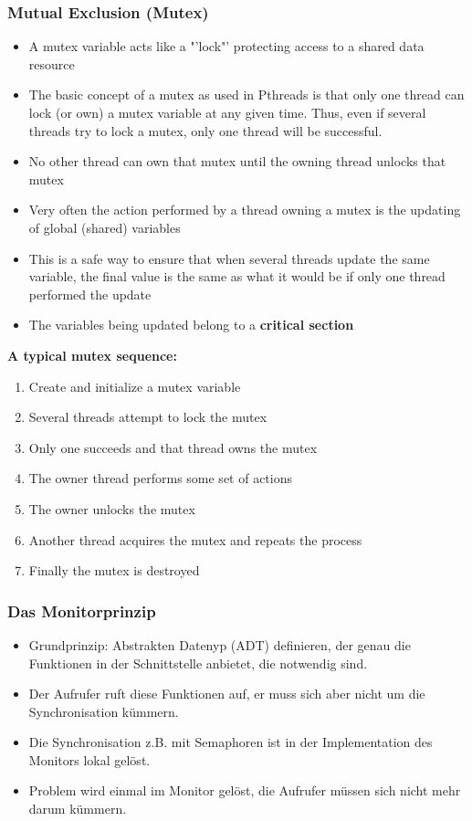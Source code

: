 \subsubsection{Mutual Exclusion (Mutex)}
\begin{itemize}
  \item A mutex variable acts like a "'lock"' protecting access to a shared data resource
  \item The basic concept of a mutex as used in Pthreads is that only one thread can lock (or own) a mutex variable at any given time. Thus, even if several threads try to lock a mutex, only one thread will be successful.
  \item No other thread can own that mutex until the owning thread unlocks that mutex
  \item Very often the action performed by a thread owning a mutex is the updating of global (shared) variables
  \item This is a safe way to ensure that when several threads update the same variable, the final value is the same as what it would be if only one thread performed the update
  \item The variables being updated belong to a \textbf{critical section}
\end{itemize}
\textbf{A typical mutex sequence:}
\begin{enumerate}
  \item Create and initialize a mutex variable
  \item Several threads attempt to lock the mutex
  \item Only one succeeds and that thread owns the mutex
  \item The owner thread performs some set of actions
  \item The owner unlocks the mutex
  \item Another thread acquires the mutex and repeats the process
  \item Finally the mutex is destroyed
\end{enumerate}



\subsubsection{Das Monitorprinzip}
\begin{itemize}
  \item Grundprinzip: Abstrakten Datenyp (ADT) definieren, der genau die Funktionen
        in der Schnittstelle anbietet, die notwendig sind.
  \item Der Aufrufer ruft diese Funktionen auf, er muss sich aber nicht um die
        Synchronisation kümmern.
  \item Die Synchronisation z.B. mit Semaphoren ist in der Implementation des
        Monitors lokal gelöst.
  \item Problem wird einmal im Monitor gelöst, die Aufrufer müssen sich nicht
        mehr darum kümmern.
\end{itemize}

